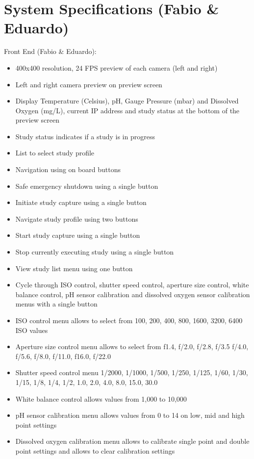\section{System Specifications (Fabio \& Eduardo)}
Front End (Fabio \& Eduardo):
\begin{itemize}
	\item 400x400 resolution, 24 FPS preview of each camera (left and right)
	\item Left and right camera preview on preview screen
	\item Display Temperature (Celsius), pH, Gauge Pressure (mbar) and Dissolved Oxygen (mg/L), current IP address and study status at the bottom of the preview screen
	\item Study status indicates if a study is in progress
	\item List to select study profile
	\item Navigation using on board buttons
	\item Safe emergency shutdown using a single button
	\item Initiate study capture using a single button
	\item Navigate study profile using two buttons
	\item Start study capture using a single button
	\item Stop currently executing study using a single button
	\item View study list menu using one button
	\item Cycle through ISO control, shutter speed control, aperture size control, white balance control, pH sensor calibration and dissolved oxygen sensor calibration menus with a single button
	\item ISO control menu allows to select from 100, 200, 400, 800, 1600, 3200, 6400 ISO values
	\item Aperture size control menu allows to select from f1.4, f/2.0, f/2.8, f/3.5 f/4.0, f/5.6, f/8.0, f/11.0, f16.0, f/22.0
	\item Shutter speed control menu 1/2000, 1/1000, 1/500, 1/250, 1/125, 1/60, 1/30, 1/15, 1/8, 1/4, 1/2, 1.0, 2.0, 4.0, 8.0, 15.0, 30.0
	\item White balance control allows values from 1,000 to 10,000
	\item pH sensor calibration menu allows values from 0 to 14 on low, mid and high point settings
	\item Dissolved oxygen calibration menu allows to calibrate single point and double point settings and allows to clear calibration settings
\end{itemize}
